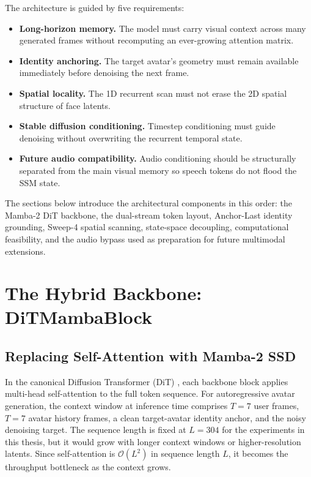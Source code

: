 \documentclass[12pt,letterpaper]{report}
\begin{document}
The architecture is guided by five requirements:

\begin{itemize}
    \item \textbf{Long-horizon memory.} The model must carry visual context across many generated frames without recomputing an ever-growing attention matrix.
    \item \textbf{Identity anchoring.} The target avatar's geometry must remain available immediately before denoising the next frame.
    \item \textbf{Spatial locality.} The 1D recurrent scan must not erase the 2D spatial structure of face latents.
    \item \textbf{Stable diffusion conditioning.} Timestep conditioning must guide denoising without overwriting the recurrent temporal state.
    \item \textbf{Future audio compatibility.} Audio conditioning should be structurally separated from the main visual memory so speech tokens do not flood the SSM state.
\end{itemize}

The sections below introduce the architectural components in this order: the Mamba-2 DiT backbone, the dual-stream token layout, Anchor-Last identity grounding, Sweep-4 spatial scanning, state-space decoupling, computational feasibility, and the audio bypass used as preparation for future multimodal extensions.

\section{The Hybrid Backbone: DiTMambaBlock}\label{sec:hybrid-backbone}

\subsection{Replacing Self-Attention with Mamba-2 SSD}

In the canonical Diffusion Transformer (DiT) \cite{peebles2023scalable}, each backbone block applies multi-head self-attention to the full token sequence. For autoregressive avatar generation, the context window at inference time comprises $T = 7$ user frames, $T = 7$ avatar history frames, a clean target-avatar identity anchor, and the noisy denoising target. The sequence length is fixed at $L=304$ for the experiments in this thesis, but it would grow with longer context windows or higher-resolution latents. Since self-attention is $\mathcal{O}(L^2)$ in sequence length $L$, it becomes the throughput bottleneck as the context grows.
\end{document}
